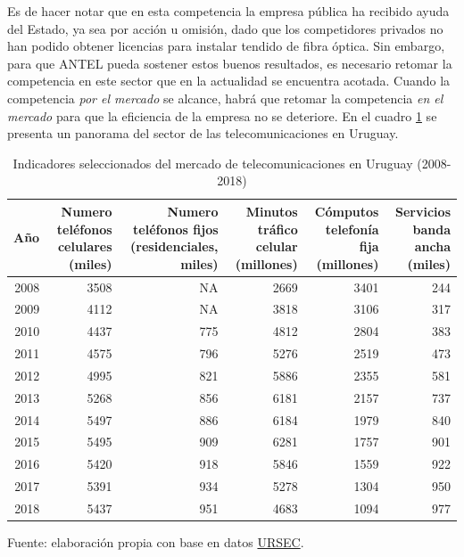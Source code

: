 \documentclass[
  12pt,
  spanish,
]{book}
\begin{document}
Es de hacer notar que en esta competencia la empresa pública ha recibido ayuda del Estado, ya sea por acción u omisión, dado que los competidores privados no han podido obtener licencias para instalar tendido de fibra óptica. Sin embargo, para que ANTEL pueda sostener estos buenos resultados, es necesario retomar la competencia en este sector que en la actualidad se encuentra acotada. Cuando la competencia \emph{por el mercado} se alcance, habrá que retomar la competencia \emph{en el mercado} para que la eficiencia de la empresa no se deteriore. En el cuadro \ref{tab:cuadro7} se presenta un panorama del sector de las telecomunicaciones en Uruguay.

\begin{table}

\caption{\label{tab:cuadro7}Indicadores seleccionados del mercado de telecomunicaciones en Uruguay (2008-2018)}
\centering
\begin{tabular}[t]{r|r|r|r|r|r}
\hline
Año & Numero teléfonos celulares (miles) & Numero teléfonos fijos (residenciales, miles) & Minutos tráfico celular (millones) & Cómputos telefonía fija (millones) & Servicios banda ancha (miles)\\
\hline
2008 & 3508 & NA & 2669 & 3401 & 244\\
\hline
2009 & 4112 & NA & 3818 & 3106 & 317\\
\hline
2010 & 4437 & 775 & 4812 & 2804 & 383\\
\hline
2011 & 4575 & 796 & 5276 & 2519 & 473\\
\hline
2012 & 4995 & 821 & 5886 & 2355 & 581\\
\hline
2013 & 5268 & 856 & 6181 & 2157 & 737\\
\hline
2014 & 5497 & 886 & 6184 & 1979 & 840\\
\hline
2015 & 5495 & 909 & 6281 & 1757 & 901\\
\hline
2016 & 5420 & 918 & 5846 & 1559 & 922\\
\hline
2017 & 5391 & 934 & 5278 & 1304 & 950\\
\hline
2018 & 5437 & 951 & 4683 & 1094 & 977\\
\hline
\end{tabular}
\end{table}

Fuente: elaboración propia con base en datos \href{https://www.gub.uy/unidad-reguladora-servicios-comunicaciones/sites/unidad-reguladora-servicios-comunicaciones/files/2019-10/Informe\%20Telecomunicaciones\%20a\%20diciembre\%20de\%202018\%20corregido.pdf}{URSEC}.
\end{document}
